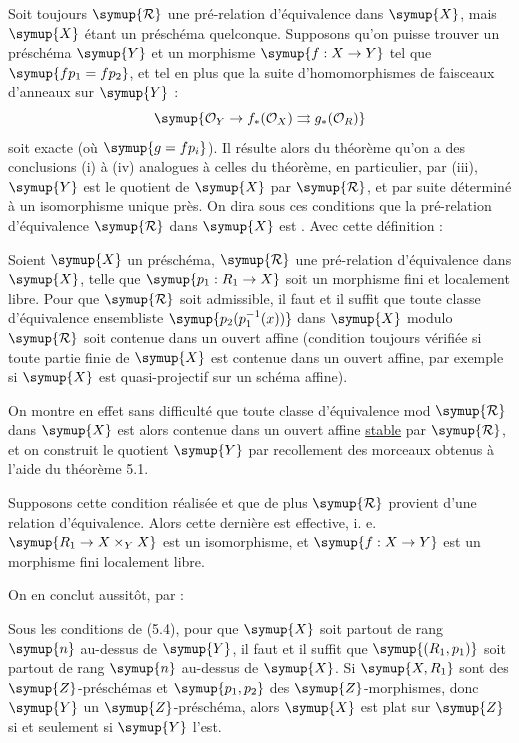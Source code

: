 Soit toujours $\symup{\mathcal R}$ une pré-relation d'équivalence  dans $\symup{X}$, mais $\symup{X}$ étant un préschéma quelconque. Supposons qu'on
puisse trouver un préschéma $\symup{Y}$ et un morphisme $\symup{f:X\to Y}$ tel que
$\symup{fp_1=fp_2}$, et tel en plus que la suite d'homomorphismes de faisceaux
d'anneaux sur $\symup{Y}$ :
\[
  \symup{\mathcal O_Y\to f_*(\mathcal O_X)
  \rightrightarrows g_*(\mathcal O_R)}
\]
soit exacte (où $\symup{g=fp_i}$). Il résulte alors du théorème qu'on a des
conclusions (i) à (iv) analogues à celles du théorème, en particulier, par
(iii), $\symup{Y}$ est le quotient de $\symup{X}$ par $\symup{\mathcal R}$, et par suite déterminé à un
isomorphisme unique près. On dira sous ces conditions que la pré-relation
d'équivalence $\symup{\mathcal R}$ dans $\symup{X}$ est . Avec cette définition :

 Soient $\symup{X}$ un préschéma, $\symup{\mathcal R}$ une pré-relation
d'équivalence dans $\symup{X}$, telle que $\symup{p_1:R_1\to X}$ soit un morphisme fini et
localement libre. Pour que $\symup{\mathcal R}$ soit admissible, il faut et il suffit que toute
classe d'équivalence ensembliste $\symup{p_2(p_1^{-1}(x))}$ dans $\symup{X}$ modulo $\symup{\mathcal R}$ soit
contenue dans un ouvert affine (condition toujours vérifiée si toute partie
finie de $\symup{X}$ est contenue dans un ouvert affine, par exemple si $\symup{X}$ est
quasi-projectif sur un schéma affine).

On montre en effet sans difficulté que toute classe d'équivalence mod $\symup{\mathcal R}$
dans $\symup{X}$ est alors contenue dans un ouvert affine \uline{stable} par $\symup{\mathcal R}$, et on
construit le quotient $\symup{Y}$ par recollement des morceaux obtenus à l'aide du
théorème 5.1.

 Supposons cette condition réalisée et que de plus
$\symup{\mathcal R}$ provient d'une relation d'équivalence. Alors cette dernière est effective,
i. e. $\symup{R_1\to X\times_Y X}$ est un isomorphisme, et $\symup{f:X\to Y}$ est un morphisme
fini localement libre.

On en conclut aussitôt, par  :

 Sous les conditions de (5.4), pour que $\symup{X}$ soit
partout de rang $\symup{n}$ au-dessus de $\symup{Y}$, il faut et il suffit que $\symup{(R_1,p_1)}$ soit
partout de rang $\symup{n}$ au-dessus de $\symup{X}$. Si $\symup{X,R_1}$ sont des $\symup{Z}$-préschémas et
$\symup{p_1,p_2}$ des $\symup{Z}$-morphismes, donc $\symup{Y}$ un $\symup{Z}$-préschéma, alors $\symup{X}$ est plat
sur $\symup{Z}$ si et seulement si $\symup{Y}$ l'est.

